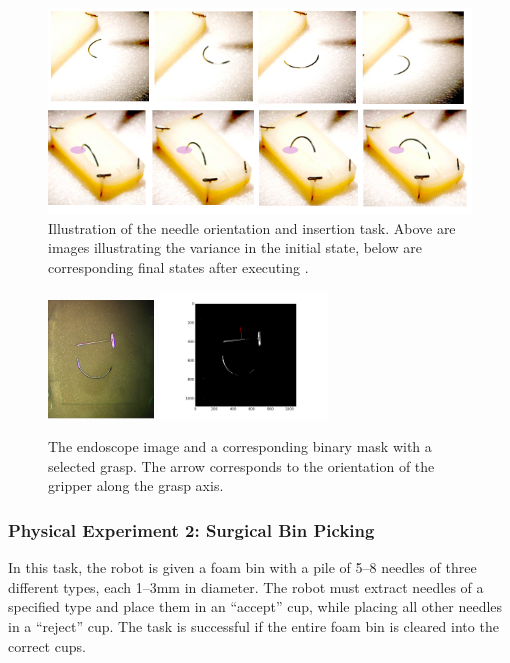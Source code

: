 \begin{figure}
    \centering
    \includegraphics[width=\textwidth]{ddco-experiments/exp3-1.png}
    \caption{Illustration of the needle orientation and insertion task. Above are images illustrating the variance in the initial state, below are corresponding final states after executing \alg.  \label{fig:dvrkexp3-1}}
\end{figure}


\begin{figure}
    \centering
    \includegraphics[width=0.25\textwidth]{ddco-experiments/image.png}
    \includegraphics[width=0.4\textwidth]{ddco-experiments/binary-mask.png}
    \caption{The endoscope image and a corresponding binary mask with a selected grasp. The arrow corresponds to the orientation of the gripper along the grasp axis.  \label{fig:dvrkim}}
\end{figure}


\subsubsection{Physical Experiment 2: Surgical Bin Picking}
In this task, the robot is given a foam bin with a pile of 5--8 needles of three different types, each 1--3mm in diameter.
The robot must extract needles of a specified type and place them in an ``accept'' cup, while placing all other needles in a ``reject'' cup.
The task is successful if the entire foam bin is cleared into the correct cups.

